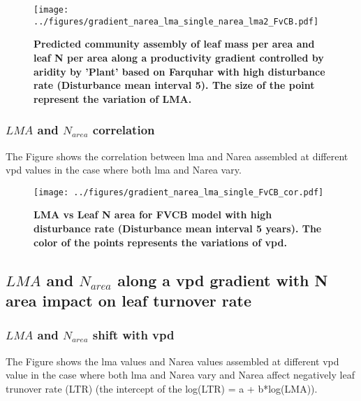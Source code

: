 \documentclass[a4paper,11pt]{article}
\begin{document}
\begin{figure}[H]
\centering
\texttt{[image: ../figures/gradient\_narea\_lma\_single\_narea\_lma2\_FvCB.pdf]}
\caption{\textbf{Predicted community assembly of leaf mass per area and leaf N per area along a productivity gradient controlled by aridity by 'Plant' based on Farquhar with high disturbance rate (Disturbance mean interval 5). The size of the point represent the variation of LMA.}
\label{fig:lma_nareaFh2}}
\end{figure}


\subsubsection{$LMA$ and $N_{area}$ correlation}

The Figure \label{fig:lma_narea_cor_single} shows the correlation
between lma and Narea assembled at different
vpd values in the case where both lma and Narea vary.

\begin{figure}[H]
\centering
\texttt{[image: ../figures/gradient\_narea\_lma\_single\_FvCB\_cor.pdf]}
\caption{\textbf{LMA vs Leaf N area for FVCB model with high
    disturbance rate (Disturbance mean interval 5 years). The color of
    the points represents the variations of vpd.}
\label{fig:lma_narea_cor_single}}
\end{figure}


\pagebreak[4]

\subsection{$LMA$ and $N_{area}$ along a vpd gradient with N area impact on leaf turnover rate}


\subsubsection{$LMA$ and $N_{area}$ shift with vpd}
The Figure \label{fig:lma_nareaFh2_NvLTR} shows the lma values and Narea values assembled at different
vpd value in the case where both lma and Narea vary and Narea affect
negatively leaf trunover rate (LTR)  (the intercept of the log(LTR) =
a + b*log(LMA)).

\end{document}
